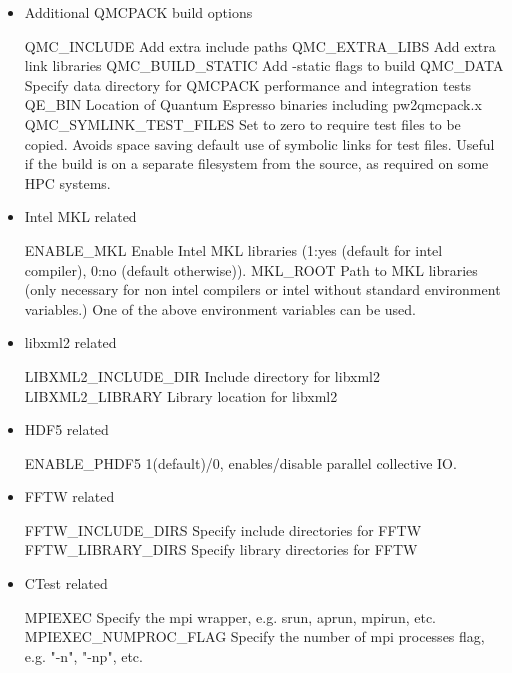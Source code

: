 \begin{itemize}
\item Additional QMCPACK build options

\begin{shade}
QMC_INCLUDE            Add extra include paths
QMC_EXTRA_LIBS         Add extra link libraries
QMC_BUILD_STATIC       Add -static flags to build
QMC_DATA               Specify data directory for QMCPACK performance and integration tests
QE_BIN                 Location of Quantum Espresso binaries including pw2qmcpack.x
QMC_SYMLINK_TEST_FILES Set to zero to require test files to be copied. Avoids space
                       saving default use of symbolic links for test files. Useful
                       if the build is on a separate filesystem from the source, as
                       required on some HPC systems.
\end{shade}

\item Intel MKL related
%
\begin{shade}
ENABLE_MKL          Enable Intel MKL libraries (1:yes (default for intel compiler),
                                                0:no (default otherwise)).
MKL_ROOT            Path to MKL libraries (only necessary for non intel compilers
                    or intel without standard environment variables.)
                    One of the above environment variables can be used.
\end{shade}

\item libxml2 related
%
\begin{shade}
LIBXML2_INCLUDE_DIR   Include directory for libxml2
LIBXML2_LIBRARY       Library location for libxml2
\end{shade}

\item HDF5 related
%
\begin{shade}
ENABLE_PHDF5    1(default)/0, enables/disable parallel collective IO.
\end{shade}

\item FFTW related
%
\begin{shade}
FFTW_INCLUDE_DIRS   Specify include directories for FFTW
FFTW_LIBRARY_DIRS   Specify library directories for FFTW
\end{shade}

\item CTest related
%
\begin{shade}
MPIEXEC                Specify the mpi wrapper, e.g. srun, aprun, mpirun, etc.
MPIEXEC_NUMPROC_FLAG   Specify the number of mpi processes flag,
                       e.g. "-n", "-np", etc.
\end{shade}


\end{itemize}
